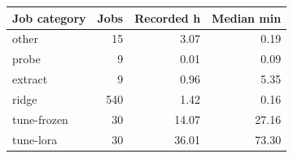 
{\small\setlength{\tabcolsep}{4pt}
\begin{tabularx}{\textwidth}{Xrrr}
\toprule
Job category & Jobs & Recorded h & Median min \\
\midrule
other & 15 & 3.07 & 0.19 \\
probe & 9 & 0.01 & 0.09 \\
extract & 9 & 0.96 & 5.35 \\
ridge & 540 & 1.42 & 0.16 \\
tune-\allowbreak{}frozen & 30 & 14.07 & 27.16 \\
tune-\allowbreak{}lora & 30 & 36.01 & 73.30 \\
\bottomrule
\end{tabularx}}
